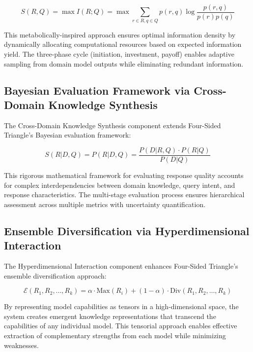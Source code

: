 \documentclass[journal,onecolumn]{IEEEtran}
\begin{document}
\begin{equation}
S(R, Q) = \max I(R; Q) = \max \sum_{r \in R, q \in Q} p(r, q) \log \frac{p(r, q)}{p(r)p(q)}
\end{equation}

This metabolically-inspired approach ensures optimal information density by dynamically allocating computational resources based on expected information yield. The three-phase cycle (initiation, investment, payoff) enables adaptive sampling from domain model outputs while eliminating redundant information.

\subsection{Bayesian Evaluation Framework via Cross-Domain Knowledge Synthesis}

The Cross-Domain Knowledge Synthesis component extends Four-Sided Triangle's Bayesian evaluation framework:

\begin{equation}
S(R|D, Q) = P(R|D, Q) = \frac{P(D|R, Q) \cdot P(R|Q)}{P(D|Q)}
\end{equation}

This rigorous mathematical framework for evaluating response quality accounts for complex interdependencies between domain knowledge, query intent, and response characteristics. The multi-stage evaluation process ensures hierarchical assessment across multiple metrics with uncertainty quantification.

\subsection{Ensemble Diversification via Hyperdimensional Interaction}

The Hyperdimensional Interaction component enhances Four-Sided Triangle's ensemble diversification approach:

\begin{equation}
\mathcal{E}(R_1, R_2, ..., R_k) = \alpha \cdot \text{Max}(R_i) + (1-\alpha) \cdot \text{Div}(R_1, R_2, ..., R_k)
\end{equation}

By representing model capabilities as tensors in a high-dimensional space, the system creates emergent knowledge representations that transcend the capabilities of any individual model. This tensorial approach enables effective extraction of complementary strengths from each model while minimizing weaknesses.
\end{document}
